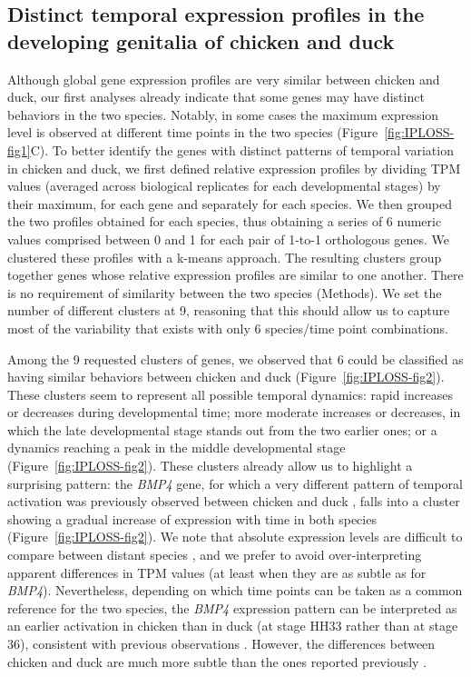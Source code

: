 \subsection{Distinct temporal expression profiles in the developing genitalia of chicken and duck}

Although global gene expression profiles are very similar between chicken and duck, our first analyses already indicate that some genes may have distinct behaviors in the two species. Notably, in some cases the maximum expression level is observed at different time points in the two species (Figure~\ref{fig:IPLOSS-fig1}C). To better identify the genes with distinct patterns of temporal variation in chicken and duck, we first defined relative expression profiles by dividing TPM values (averaged across biological replicates for each developmental stages) by their maximum, for each gene and separately for each species. We then grouped the two profiles obtained for each species, thus obtaining a series of 6 numeric values comprised between 0 and 1 for each pair of 1-to-1 orthologous genes. We clustered these profiles with a k-means approach. The resulting clusters group together genes whose relative expression profiles are similar to one another. There is no requirement of similarity between the two species (Methods). We set the number of different clusters at 9, reasoning that this should allow us to capture most of the variability that exists with only 6 species/time point combinations. 

Among the 9 requested clusters of genes, we observed that 6 could be classified as having similar behaviors between chicken and duck (Figure~\ref{fig:IPLOSS-fig2}). These clusters seem to represent all possible temporal dynamics: rapid increases or decreases during developmental time; more moderate increases or decreases, in which the late developmental stage stands out from the two earlier ones; or a dynamics reaching a peak in the middle developmental stage (Figure~\ref{fig:IPLOSS-fig2}). These clusters already allow us to highlight a surprising pattern: the \textit{BMP4} gene, for which a very different pattern of temporal activation was previously observed between chicken and duck \citep{herrera_developmental_2013}, falls into a cluster showing a gradual increase of expression with time in both species (Figure~\ref{fig:IPLOSS-fig2}). We note that absolute expression levels are difficult to compare between distant species \citep{brawand_evolution_2011}, and we prefer to avoid over-interpreting apparent differences in TPM values (at least when they are as subtle as for \textit{BMP4}). Nevertheless, depending on which time points can be taken as a common reference for the two species, the \textit{BMP4} expression pattern can be interpreted as an earlier activation in chicken than in duck (at stage HH33 rather than at stage 36), consistent with previous observations \citep{herrera_developmental_2013}. However, the differences between chicken and duck are much more subtle than the ones reported previously \citep{herrera_developmental_2013}. \\


